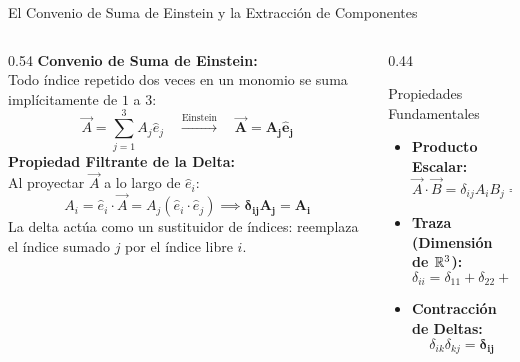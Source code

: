 \documentclass[10pt,aspectratio=169]{beamer}
\begin{document}
\begin{frame}{El Convenio de Suma de Einstein y la Extracción de Componentes}
  \begin{columns}[c]
    \begin{column}{0.54\textwidth}
      \footnotesize
      \textbf{Convenio de Suma de Einstein:}\\[2pt]
      Todo índice repetido dos veces en un monomio se suma implícitamente de $1$ a $3$:
      \[
      \vec{A} = \sum_{j=1}^3 A_j \hat{e}_j \quad \xrightarrow{\text{Einstein}} \quad \mathbf{\vec{A} = A_j \hat{e}_j}
      \]
      \textbf{Propiedad Filtrante de la Delta:}\\[2pt]
      Al proyectar $\vec{A}$ a lo largo de $\hat{e}_i$:
      \[
      A_i = \hat{e}_i \cdot \vec{A} = A_j (\hat{e}_i \cdot \hat{e}_j) \implies \mathbf{\delta_{ij} A_j = A_i}
      \]
      La delta actúa como un sustituidor de índices: reemplaza el índice sumado $j$ por el índice libre $i$.
    \end{column}
    \begin{column}{0.44\textwidth}
      \begin{block}{Propiedades Fundamentales}
        \footnotesize
        \begin{itemize}
          \itemsep3pt
          \item \textbf{Producto Escalar:}
          \[
          \vec{A}\cdot\vec{B} = \delta_{ij} A_i B_j = \mathbf{A_i B_i}
          \]
          \item \textbf{Traza (Dimensión de $\mathbb{R}^3$):}
          \[
          \delta_{ii} = \delta_{11} + \delta_{22} + \delta_{33} = \mathbf{3}
          \]
          \item \textbf{Contracción de Deltas:}
          \[
          \delta_{ik}\delta_{kj} = \mathbf{\delta_{ij}}
          \]
        \end{itemize}
      \end{block}
    \end{column}
  \end{columns}
\end{frame}
\end{document}
